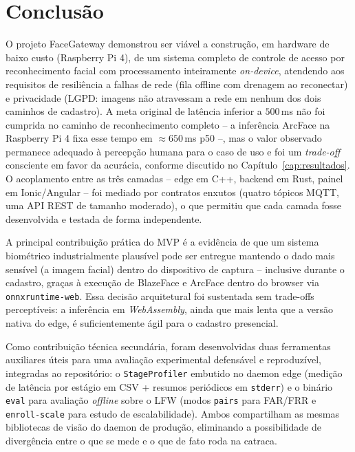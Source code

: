 \documentclass[12pt,a4paper]{report}
\begin{document}
\chapter{Conclusão}

O projeto FaceGateway demonstrou ser viável a construção, em hardware
de baixo custo (Raspberry Pi 4), de um sistema completo de controle
de acesso por reconhecimento facial com processamento inteiramente
\textit{on-device}, atendendo aos requisitos de resiliência a falhas
de rede (fila offline com drenagem ao reconectar) e privacidade
(LGPD: imagens não atravessam a rede em nenhum dos dois caminhos de
cadastro). A meta original de latência inferior a $500\,$ms não foi
cumprida no caminho de reconhecimento completo -- a inferência
ArcFace na Raspberry Pi 4 fixa esse tempo em $\approx 650\,$ms p50 --,
mas o valor observado permanece adequado à percepção humana para o
caso de uso e foi um \textit{trade-off} consciente em favor da
acurácia, conforme discutido no Capítulo~\ref{cap:resultados}. O acoplamento entre as três
camadas -- edge em C++, backend em Rust, painel em Ionic/Angular --
foi mediado por contratos enxutos (quatro tópicos MQTT, uma API REST
de tamanho moderado), o que permitiu que cada camada fosse
desenvolvida e testada de forma independente.

A principal contribuição prática do MVP é a evidência de que um
sistema biométrico industrialmente plausível pode ser entregue
mantendo o dado mais sensível (a imagem facial) dentro do dispositivo
de captura -- inclusive durante o cadastro, graças à execução de
BlazeFace e ArcFace dentro do browser via
\texttt{onnxruntime-web}. Essa decisão arquitetural foi sustentada
sem trade-offs perceptíveis: a inferência em
\textit{WebAssembly}, ainda que mais lenta que a versão nativa do
edge, é suficientemente ágil para o cadastro presencial.

Como contribuição técnica secundária, foram desenvolvidas duas
ferramentas auxiliares úteis para uma avaliação experimental
defensável e reproduzível, integradas ao repositório: o
\texttt{StageProfiler} embutido no daemon edge (medição de latência
por estágio em CSV + resumos periódicos em \texttt{stderr}) e o
binário \texttt{eval} para avaliação \textit{offline} sobre o LFW
(modos \texttt{pairs} para FAR/FRR e \texttt{enroll-scale} para
estudo de escalabilidade). Ambos compartilham as mesmas bibliotecas
de visão do daemon de produção, eliminando a possibilidade de
divergência entre o que se mede e o que de fato roda na catraca.
\end{document}
